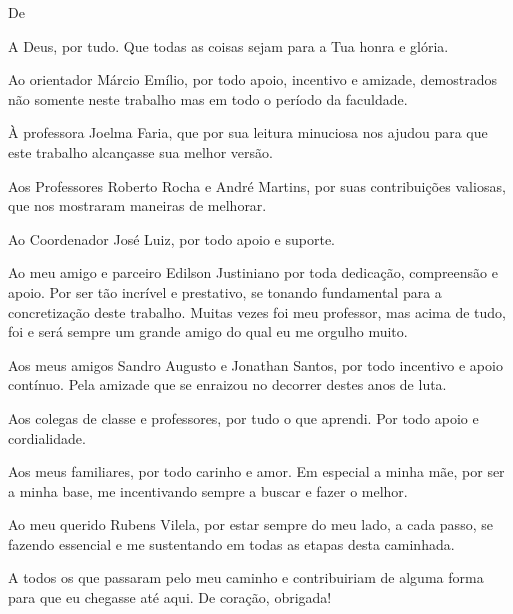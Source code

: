 \begin{agradecimentos}

De \imprimirAutorUm
\newline
\par A Deus, por tudo. Que todas as coisas sejam para a Tua honra e glória.

\par Ao orientador Márcio Emílio, por todo apoio, incentivo e amizade, demostrados não somente neste trabalho mas em todo o período da faculdade.

\par À professora Joelma Faria, que por sua leitura minuciosa nos ajudou para que este trabalho alcançasse sua melhor versão.

\par Aos Professores Roberto Rocha e André Martins, por suas contribuições valiosas, que nos mostraram maneiras de melhorar.

\par Ao Coordenador José Luiz, por todo apoio e suporte.

\par Ao meu amigo e parceiro Edilson Justiniano por toda dedicação, compreensão e apoio. Por ser tão incrível e prestativo, se tonando fundamental para a concretização deste trabalho. Muitas vezes foi meu professor, mas acima de tudo, foi e será sempre um grande amigo do qual eu me orgulho muito.

\par Aos meus amigos Sandro Augusto e Jonathan Santos, por todo incentivo e apoio contínuo. Pela amizade que se enraizou no decorrer destes anos de luta.

\par Aos colegas de classe e professores, por tudo o que aprendi. Por todo apoio e cordialidade.

\par Aos meus familiares, por todo carinho e amor. Em especial a minha mãe, por ser a minha base, me incentivando sempre a buscar e fazer o melhor. 

\par Ao meu querido Rubens Vilela, por estar sempre do meu lado, a cada passo, se fazendo essencial e me sustentando em todas as etapas desta caminhada.

\par A todos os que passaram pelo meu caminho e contribuiriam de alguma forma para que eu chegasse até aqui. De coração, obrigada!




\end{agradecimentos}
